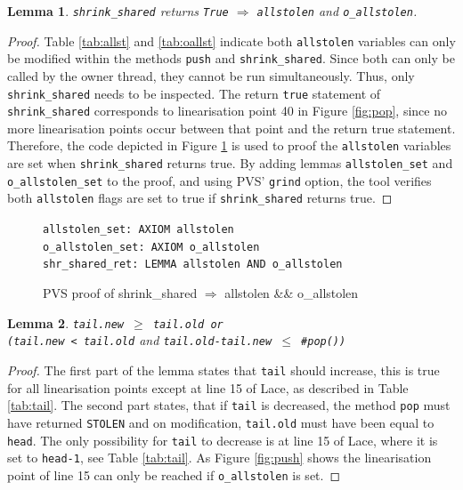 \documentclass{sig-alternate-br}
\newtheorem{lemma}{Lemma}
\begin{document}
\begin{lemma}
	\texttt{shrink\_shared} returns \texttt{True} $\Rightarrow$ \texttt{allstolen} and \texttt{o\_allstolen}.
\end{lemma}
\begin{proof}
	Table \ref{tab:allst} and \ref{tab:oallst} indicate both \texttt{allstolen} variables can only be modified within the methods \texttt{push} and \texttt{shrink\_shared}. Since both can only be called by the owner thread, they cannot be run simultaneously.  Thus, only \texttt{shrink\_shared} needs to be inspected. The return \texttt{true} statement of \texttt{shrink\_shared} corresponds to linearisation point 40 in Figure \ref{fig:pop}, since no more linearisation points occur between that point and the return true statement. Therefore, the code depicted in Figure \ref{pvs:shrshared} is used to proof the \texttt{allstolen} variables are set when \texttt{shrink\_shared} returns true. By adding lemmas \texttt{allstolen\_set} and \texttt{o\_allstolen\_set} to the proof, and using PVS' \texttt{grind} option, the tool verifies both \texttt{allstolen} flags are set to true if \texttt{shrink\_shared} returns true.
\end{proof}
\begin{figure}
	\texttt{allstolen\_set: AXIOM allstolen}\\
	\texttt{o\_allstolen\_set: AXIOM o\_allstolen}\\
	\texttt{shr\_shared\_ret: LEMMA allstolen AND o\_allstolen}
	\caption{PVS proof of shrink\_shared $\Rightarrow$ allstolen \&\& o\_allstolen}
	\label{pvs:shrshared}
\end{figure}

\begin{lemma}
	\texttt{tail.new $\geq$ tail.old or\\(tail.new < tail.old} and \texttt{tail.old-tail.new $\leq$ \#pop())}
\end{lemma}
\begin{proof}
	The first part of the lemma states that \texttt{tail} should increase, this is true for all linearisation points except at line 15 of Lace, as described in Table \ref{tab:tail}.
	The second part states, that if \texttt{tail} is decreased, the method \texttt{pop} must have returned \texttt{STOLEN} and on modification, \texttt{tail.old} must have been equal to \texttt{head}.
	The only possibility for \texttt{tail} to decrease is at line 15 of Lace, where it is set to \texttt{head-1}, see Table \ref{tab:tail}.
	As Figure \ref{fig:push} shows the linearisation point of line 15 can only be reached if \texttt{o\_allstolen} is set.
	
\end{proof}
\end{document}

